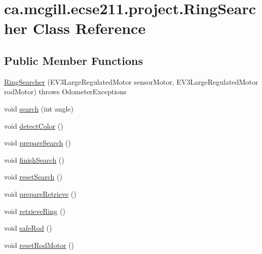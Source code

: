 \hypertarget{classca_1_1mcgill_1_1ecse211_1_1project_1_1_ring_searcher}{}\section{ca.\+mcgill.\+ecse211.\+project.\+Ring\+Searcher Class Reference}
\label{classca_1_1mcgill_1_1ecse211_1_1project_1_1_ring_searcher}
\subsection*{Public Member Functions}
\begin{DoxyCompactItemize}
\item 
\hyperlink{classca_1_1mcgill_1_1ecse211_1_1project_1_1_ring_searcher_a37eebb6cbdfd692e0979c3ca0fe2597b}{Ring\+Searcher} (E\+V3\+Large\+Regulated\+Motor sensor\+Motor, E\+V3\+Large\+Regulated\+Motor rod\+Motor)  throws Odometer\+Exceptions 
\item 
void \hyperlink{classca_1_1mcgill_1_1ecse211_1_1project_1_1_ring_searcher_a6f66df0810034dfb407d792ded013a8e}{search} (int angle)
\item 
void \hyperlink{classca_1_1mcgill_1_1ecse211_1_1project_1_1_ring_searcher_a997bf874ae5577c48719254677830fb7}{detect\+Color} ()
\item 
void \hyperlink{classca_1_1mcgill_1_1ecse211_1_1project_1_1_ring_searcher_abf31c36cadb144a4651b11f7fa37120a}{prepare\+Search} ()
\item 
void \hyperlink{classca_1_1mcgill_1_1ecse211_1_1project_1_1_ring_searcher_a6edfdbd31d9848ff885e2e4caa3b46c6}{finish\+Search} ()
\item 
void \hyperlink{classca_1_1mcgill_1_1ecse211_1_1project_1_1_ring_searcher_ad73c50b29163d91292de418101cce21e}{reset\+Search} ()
\item 
void \hyperlink{classca_1_1mcgill_1_1ecse211_1_1project_1_1_ring_searcher_a3de30b85b1445157d7f8572992de7651}{prepare\+Retrieve} ()
\item 
void \hyperlink{classca_1_1mcgill_1_1ecse211_1_1project_1_1_ring_searcher_afca3a0c746b07abb88881d926f4fe71f}{retrieve\+Ring} ()
\item 
void \hyperlink{classca_1_1mcgill_1_1ecse211_1_1project_1_1_ring_searcher_a0b96c45f7df3eb557496acab33930cd5}{safe\+Rod} ()
\item 
void \hyperlink{classca_1_1mcgill_1_1ecse211_1_1project_1_1_ring_searcher_a8b0ea0bf4cd07b6c8a090c3e9bc8eb04}{reset\+Rod\+Motor} ()
\end{DoxyCompactItemize}


